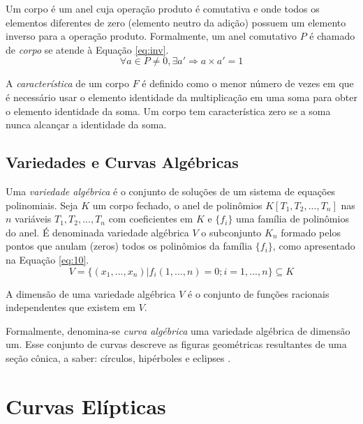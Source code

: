 Um corpo é um anel cuja operação produto é comutativa e onde todos os elementos diferentes de zero (elemento neutro da adição) possuem um elemento inverso para a operação produto. Formalmente, um anel comutativo \(P\) é chamado de \textit{corpo} se atende à Equação \ref{eq:inv}.
\begin{equation}
  \forall a \in P \neq {0}, \exists a' \Rightarrow a \times a' = 1
    \label{eq:inv}
\end{equation}

A \textit{característica} de um corpo \(F\) é definido como o menor número de vezes em que é necessário usar o elemento identidade da multiplicação em uma soma para obter o elemento identidade da soma. Um corpo tem característica zero se a soma nunca alcançar a identidade da soma.

%
% 
\subsection{Variedades e Curvas Algébricas}
Uma \textit{variedade algébrica} é o conjunto de soluções de um sistema de equações polinomiais. Seja \(K\) um corpo fechado, o anel de polinômios \(K[T_1 , T_2, ..., T_n ]\) nas \(n\) variáveis \(T_1 , T_2 , ..., T_n \) com coeficientes em \(K\) e \(\{f_{i}\}\) uma família de polinômios do anel. É denominada variedade algébrica \(V\) o subconjunto \(K_n\) formado pelos pontos que anulam (zeros) todos os polinômios da família \(\{f_{i}\}\), como apresentado na Equação \ref{eq:10}.
\begin{equation}
V = \{(x_1 , ..., x_n ) | f_{i}(1, ..., n) = 0; i = 1, ..., n\} \subseteq K \label{eq:10}
\end{equation}

A dimensão de uma variedade algébrica \(V\)  é o conjunto de funções racionais independentes que existem em \(V\).
\par Formalmente,  denomina-se \textit{curva algébrica} uma variedade algébrica de dimensão um. Esse conjunto de curvas descreve as figuras geométricas resultantes de uma seção cônica, a saber: círculos, hipérboles e eclipses \cite{Thomas:2004}.

%
%
\section{Curvas Elípticas}

%
%

